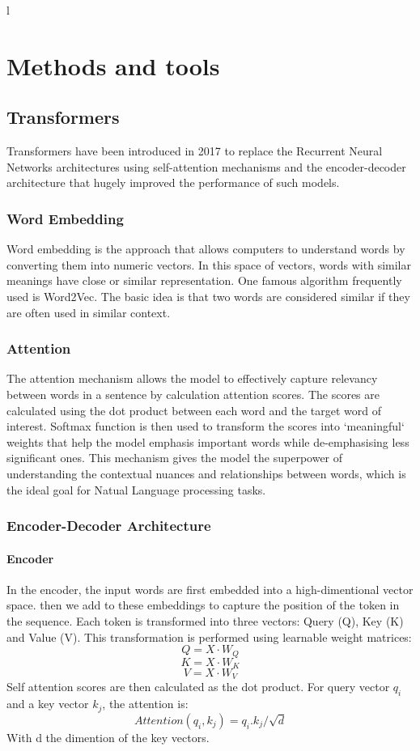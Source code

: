 l\documentclass[a4paper,12pt,twoside]{report}
\begin{document}
\chapter{Methods and tools}
\thispagestyle{empty}
\section{Transformers}
Transformers\cite{NIPS2017_3f5ee243} have been introduced in 2017 to replace the Recurrent Neural Networks architectures using self-attention mechanisms and the encoder-decoder architecture that hugely improved the performance of such models.

\subsection{Word Embedding}
Word embedding is the approach that allows computers to understand words by converting them into numeric vectors. In this space of vectors, words with similar meanings have close or similar representation. One famous algorithm frequently used is Word2Vec\cite{mikolov2013efficient}. The basic idea is that two words are considered similar if they are often used in similar context.

\subsection{Attention}
The attention mechanism allows the model to effectively capture relevancy between words in a sentence by calculation attention scores. The scores are calculated using the dot product between each word and the target word of interest. Softmax function is then used to transform the scores into `meaningful` weights that help the model emphasis important words while de-emphasising less significant ones. This mechanism gives the model the superpower of understanding the contextual nuances and relationships between words, which is the ideal goal for Natual Language processing tasks.


\subsection{Encoder-Decoder Architecture}
\subsubsection{Encoder}
In the encoder, the input words are first embedded into a high-dimentional vector space. then we add to these embeddings to capture the position of the token in the sequence. Each token is transformed into three vectors: Query (Q), Key (K) and Value (V). This transformation is performed using learnable weight matrices:
$$Q = X \cdot W_{Q}$$
$$K = X \cdot W_{K}$$
$$V = X \cdot W_{V}$$
Self attention scores are then calculated as the dot product. For query vector $q_{i}$ and a key vector $k_{j}$, the attention is: 
$$Attention(q_{i},k_{j}) = q_{i} . k_{j} / \sqrt{d}$$ 
With d the dimention of the key vectors.
\end{document}
